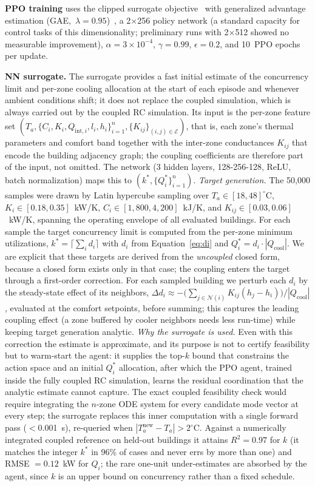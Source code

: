 \documentclass[12pt,a4paper]{article}
\begin{document}
\textbf{PPO training} uses the clipped surrogate objective~\cite{ref32} with generalized advantage estimation (GAE,~$\lambda = 0.95$)~\cite{ref38}, a 2$\times$256 policy network (a standard capacity for control tasks of this dimensionality; preliminary runs with 2$\times$512 showed no measurable improvement), $\alpha = 3\!\times\!10^{-4}$, $\gamma = 0.99$, $\epsilon = 0.2$, and 10~PPO epochs per update.

\textbf{NN surrogate.} The surrogate provides a fast initial estimate of the concurrency limit and per-zone cooling allocation at the start of each episode and whenever ambient conditions shift; it does not replace the coupled simulation, which is always carried out by the coupled RC simulation. Its input is the per-zone feature set $(T_a, \{C_i, K_i, Q_{\text{int},i}, l_i, h_i\}_{i=1}^n, \{K_{ij}\}_{(i,j)\in\mathcal{E}})$, that is, each zone's thermal parameters and comfort band together with the inter-zone conductances $K_{ij}$ that encode the building adjacency graph; the coupling coefficients are therefore part of the input, not omitted. The network (3 hidden layers, 128-256-128, ReLU, batch normalization) maps this to $(k^*, \{Q_i^*\}_{i=1}^n)$. \textit{Target generation.} The 50{,}000 samples were drawn by Latin hypercube sampling over $T_a \in [18, 48]^\circ$C, $K_i \in [0.18, 0.35]$~kW/K, $C_i \in [1{,}800, 4{,}200]$~kJ/K, and $K_{ij} \in [0.03, 0.06]$~kW/K, spanning the operating envelope of all evaluated buildings. For each sample the target concurrency limit is computed from the per-zone minimum utilizations, $k^* = \lceil \sum_i d_i \rceil$ with $d_i$ from Equation~\eqref{eq:di} and $Q_i^* = d_i \cdot |Q_{\text{cool}}|$. We are explicit that these targets are derived from the \textit{uncoupled} closed form, because a closed form exists only in that case; the coupling enters the target through a first-order correction. For each sampled building we perturb each $d_i$ by the steady-state effect of its neighbors, $\Delta d_i \approx -\big(\sum_{j\in\mathcal{N}(i)} K_{ij}(h_j - h_i)\big)/|Q_{\text{cool}}|$, evaluated at the comfort setpoints, before summing; this captures the leading coupling effect (a zone buffered by cooler neighbors needs less run-time) while keeping target generation analytic. \textit{Why the surrogate is used.} Even with this correction the estimate is approximate, and its purpose is not to certify feasibility but to warm-start the agent: it supplies the top-$k$ bound that constrains the action space and an initial $Q_i^*$ allocation, after which the PPO agent, trained inside the fully coupled RC simulation, learns the residual coordination that the analytic estimate cannot capture. The exact coupled feasibility check would require integrating the $n$-zone ODE system for every candidate mode vector at every step; the surrogate replaces this inner computation with a single forward pass ($<$0.001~s), re-queried when $|T_a^{\text{new}} - T_a| > 2^\circ$C. Against a numerically integrated coupled reference on held-out buildings it attains $R^2 = 0.97$ for $k$ (it matches the integer $k^*$ in 96\% of cases and never errs by more than one) and RMSE $= 0.12$~kW for $Q_i$; the rare one-unit under-estimates are absorbed by the agent, since $k$ is an upper bound on concurrency rather than a fixed schedule.
\end{document}
